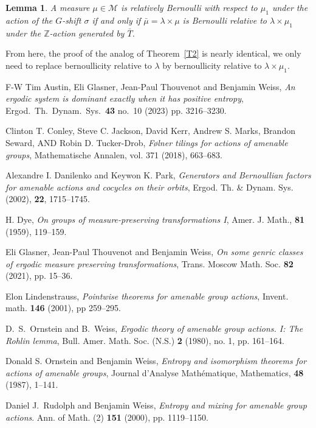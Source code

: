\documentclass{amsart}
\newtheorem{lem}[thm]{Lemma}
\theoremstyle{remark}
\def \Z {\mathbb Z}
\def \M {\mathcal M}
\begin{document}
\begin{lem}\label{L4n}A measure $\mu\in\M$ is relatively Bernoulli with respect to $\mu_1$ under the action of the $G$-shift $\sigma$ if and only if $\bar\mu=\lambda\times\mu$ is Bernoulli relative to $\lambda\times\mu_1$ under the $\Z$-action generated by $\bar T$. 
\end{lem}

From here, the proof of the analog of Theorem~\ref{T2} is nearly identical, we only need to replace bernoullicity relative to $\lambda$ by 
bernoullicity relative to $\lambda\times\mu_1$.


\bigskip
\begin{thebibliography}{F-W}
Tim Austin, Eli Glasner, Jean-Paul Thouvenot and
Benjamin Weiss, \emph{An ergodic system is dominant exactly when
it has positive entropy}, Ergod.\ Th.\ Dynam.\ Sys.\ {\bf 43} no.\ 10 (2023) pp. 3216--3230.


Clinton T. Conley, Steve C. Jackson, David Kerr, Andrew S. Marks,
Brandon Seward, AND Robin D. Tucker-Drob, \emph{F\o lner tilings for actions of amenable groups}, Mathematische Annalen, {vol. 371} (2018), 663--683.

Alexandre I. Danilenko and Keywon K. Park, \emph{Generators and Bernoullian factors for amenable actions and cocycles on their orbits}, Ergod. Th. \& Dynam. Sys. (2002), {\bf 22}, 1715--1745.

 H. Dye, \emph{On groups of measure-preserving transformations I}, Amer. J. Math., {\bf 81} (1959), 119--159.

Eli Glasner, Jean-Paul Thouvenot and Benjamin Weiss, \emph{On some genric classes of ergodic measure preserving transformations}, Trans. Moscow Math. Soc. {\bf 82} (2021), pp. 15--36.

Elon Lindenstrauss, \emph{Pointwise theorems for amenable group actions}, Invent. math. {\bf 146} (2001), pp 259--295.

D.\ S.\ Ornstein and B.\ Weiss, \emph{Ergodic theory of amenable group actions. I: The Rohlin lemma},
Bull. Amer. Math. Soc. (N.S.) {\bf 2} (1980), no. 1, pp. 161--164.

Donald S. Ornstein and Benjamin Weiss, \emph{Entropy and isomorphism theorems for actions of amenable groups}, Journal d'Analyse Math\'ematique, Mathematics, {\bf 48} (1987), 1--141.

Daniel J.\ Rudolph and Benjamin Weiss, \emph{Entropy and mixing for amenable group actions}. Ann. of Math. (2)
{\bf 151} (2000), pp. 1119--1150.


\end{thebibliography}
\end{document}
